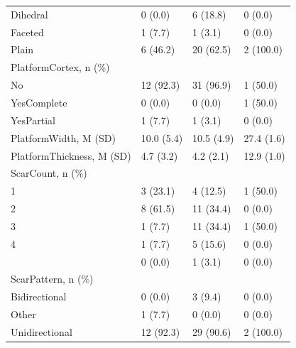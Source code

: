 \documentclass[12pt,twoside]{reedthesis}
\begin{document}
\begin{longtable}[t]{llll}
Dihedral & 0 (0.0) & 6 (18.8) & 0 (0.0)\\
Faceted & 1 (7.7) & 1 (3.1) & 0 (0.0)\\
Plain & 6 (46.2) & 20 (62.5) & 2 (100.0)\\
PlatformCortex, n (\%) &  &  & \\
\addlinespace
No & 12 (92.3) & 31 (96.9) & 1 (50.0)\\
YesComplete & 0 (0.0) & 0 (0.0) & 1 (50.0)\\
YesPartial & 1 (7.7) & 1 (3.1) & 0 (0.0)\\
PlatformWidth, M (SD) & 10.0 (5.4) & 10.5 (4.9) & 27.4 (1.6)\\
PlatformThickness, M (SD) & 4.7 (3.2) & 4.2 (2.1) & 12.9 (1.0)\\
\addlinespace
ScarCount, n (\%) &  &  & \\
1 & 3 (23.1) & 4 (12.5) & 1 (50.0)\\
2 & 8 (61.5) & 11 (34.4) & 0 (0.0)\\
3 & 1 (7.7) & 11 (34.4) & 1 (50.0)\\
4 & 1 (7.7) & 5 (15.6) & 0 (0.0)\\
\addlinespace
7 & 0 (0.0) & 1 (3.1) & 0 (0.0)\\
ScarPattern, n (\%) &  &  & \\
Bidirectional & 0 (0.0) & 3 (9.4) & 0 (0.0)\\
Other & 1 (7.7) & 0 (0.0) & 0 (0.0)\\
Unidirectional & 12 (92.3) & 29 (90.6) & 2 (100.0)\\
\bottomrule
\end{longtable}
\begin{table}

\caption{\label{tab:unnamed-chunk-76}Terminal Gravettian Blank measurements (width, length and thickness) with mean and standard deviation values.}
\centering
{}
\end{table}
\end{document}
